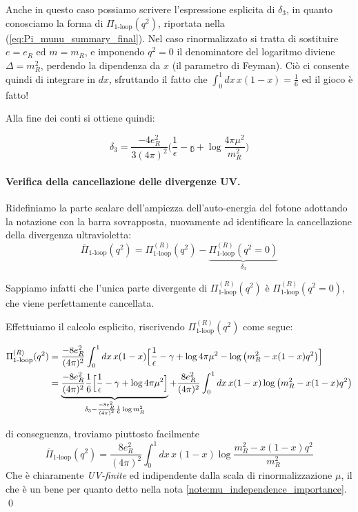 \documentclass[../main.tex]{subfiles}
\begin{document}
Anche in questo caso possiamo scrivere l'espressione esplicita di $\delta_3$, in quanto conosciamo la forma di $\Pi_\text{1-loop}(q^2)$, riportata nella (\ref{eq:Pi_munu_summary_final}). Nel caso rinormalizzato si tratta di sostituire $e=e_R$ ed $m=m_R$, e imponendo $q^2=0$ il denominatore del logaritmo diviene $\Delta = m_R^2$, perdendo la dipendenza da $x$ (il parametro di Feyman).
Ciò ci consente quindi di integrare in $dx$, sfruttando il fatto che \(\int_0^1 dx \, x(1-x)= \frac{1}{6}\) ed il gioco è fatto!

Alla fine dei conti si ottiene quindi:

\begin{equation}
    \delta_3 = \frac{-4e_R^2}{3(4\pi)^2}\Biggl( \frac{1}{\epsilon} - \mathbb \gamma + \log{\frac{4\pi\mu^2}{m_R^2}} \Biggr)
    \label{eq:delta3_explicit}
\end{equation}

\paragraph{Verifica della cancellazione delle divergenze UV.} Ridefiniamo la parte scalare dell'ampiezza dell'auto-energia del fotone adottando la notazione con la barra sovrapposta, nuovamente ad identificare la cancellazione della divergenza ultravioletta: 
\[\overline\Pi_\text{1-loop}(q^2) = \Pi^{(R)}_\text{1-loop}(q^2) - \underbrace{\Pi^{(R)}_\text{1-loop}(q^2=0)}_{\delta_3} \]

Sappiamo infatti che l'unica parte divergente di \(\Pi^{(R)}_\text{1-loop}(q^2) \) è  \(\Pi^{(R)}_\text{1-loop}(q^2=0)\), che viene perfettamente cancellata.

Effettuiamo il calcolo esplicito, riscrivendo \(\Pi^{(R)}_\text{1-loop}(q^2) \) come segue:

\begin{align*}
    \Pi^{(R)}_\text{1-loop}(q^2) & = \frac{-8e_R^2}{(4\pi)^2}\int_0^1 dx \, x(1-x)\Bigl[ \frac{1}{\epsilon} - \mathbb \gamma + \log{4\pi\mu^2} - \log{\bigl(m_R^2- x(1-x)q^2\bigr)}\Bigr] \\
    & = \underbrace{\frac{-8{e}_R^2}{(4\pi)^2}\frac{1}{6}\Bigl[ \frac{1}{\epsilon} - \mathbb \gamma + \log{4\pi\mu^2}\Bigr]}_{\delta_3 - \frac{-8e_R^2}{(4\pi)^2}\frac{1}{6}\log{m_R^2}} + \frac{8e_R^2}{(4\pi)^2}\int_0^1 dx \,x(1-x)\log{\bigl(m_R^2- x(1-x)q^2\bigr)}
\end{align*}

di conseguenza, troviamo piuttosto facilmente 
\begin{equation}
    \overline\Pi_\text{1-loop}(q^2) = \frac{8e_R^2}{(4\pi)^2}\int_0^1 dx \,x(1-x)\log{\frac{m_R^2- x(1-x)q^2}{m_R^2}}
    \label{eq:bar_pi_1loop_fixed}
\end{equation}
Che è chiaramente \textit{UV-finite} ed indipendente dalla scala di rinormalizzazione $\mu$, il che è un bene per quanto detto nella nota \ref{note:mu_independence_importance}. \qed
\end{document}
